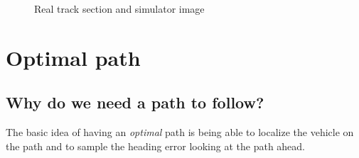 \documentclass[a4paper,12pt,sort&compress]{article}
\begin{document}
    \begin{figure}
        \begin{subfigure}[c]{\textwidth}
            \centering
        \end{subfigure}
        \begin{subfigure}[c]{\textwidth}
            \centering
        \end{subfigure}
        \caption{Real track section and simulator image}
        \label{fig:simulator_real_track}
    \end{figure}

\clearpage

\section{Optimal path}

    \subsection{Why do we need a path to follow?}
    The basic idea of having an \textit{optimal} path is being able to localize the vehicle on the
    path and to sample the heading error looking at the path ahead. 
\end{document}
